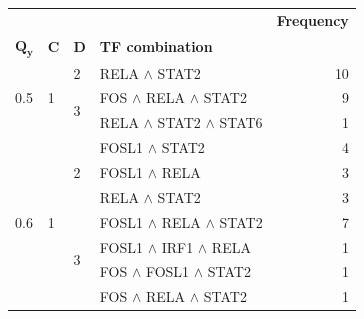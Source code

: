 \begin{tabular}{llllr}
\toprule
 &  &  &  & \textbf{Frequency} \\
$\mathbf{Q_y}$ & $\mathbf{C}$ & $\mathbf{D}$ & \textbf{TF combination} &  \\
\midrule
\multirow[t]{3}{*}{0.5} & \multirow[t]{3}{*}{1} & 2 & {RELA $\wedge$ STAT2} & 10 \\
\cline{3-5}
 &  & \multirow[t]{2}{*}{3} & {FOS $\wedge$ RELA $\wedge$ STAT2} & 9 \\
 &  &  & {RELA $\wedge$ STAT2 $\wedge$ STAT6} & 1 \\
\cline{1-5} \cline{2-5} \cline{3-5}
\multirow[t]{7}{*}{0.6} & \multirow[t]{7}{*}{1} & \multirow[t]{3}{*}{2} & {FOSL1 $\wedge$ STAT2} & 4 \\
 &  &  & {FOSL1 $\wedge$ RELA} & 3 \\
 &  &  & {RELA $\wedge$ STAT2} & 3 \\
\cline{3-5}
 &  & \multirow[t]{4}{*}{3} & {FOSL1 $\wedge$ RELA $\wedge$ STAT2} & 7 \\
 &  &  & {FOSL1 $\wedge$ IRF1 $\wedge$ RELA} & 1 \\
 &  &  & {FOS $\wedge$ FOSL1 $\wedge$ STAT2} & 1 \\
 &  &  & {FOS $\wedge$ RELA $\wedge$ STAT2} & 1 \\
\cline{1-5} \cline{2-5} \cline{3-5}
\bottomrule
\end{tabular}
